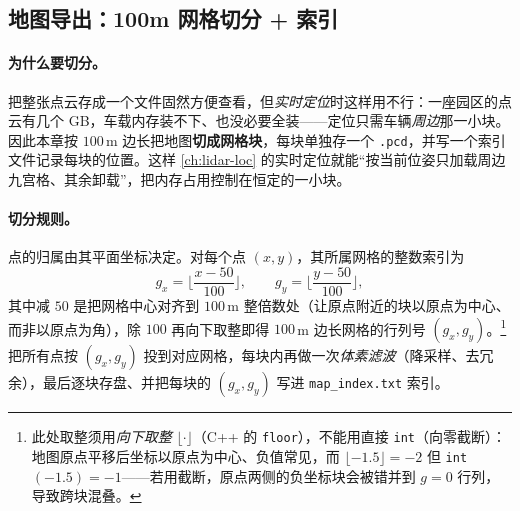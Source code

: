 \subsection{地图导出：100m 网格切分 + 索引}
\label{sec:lidar-map-grid}

\paragraph{为什么要切分。}
把整张点云存成一个文件固然方便查看，但\emph{实时定位}时这样用不行：一座园区的点云有几个 GB，车载内存装不下、也没必要全装——定位只需车辆\emph{周边}那一小块。因此本章按 $100$\,m 边长把地图\textbf{切成网格块}，每块单独存一个 \texttt{.pcd}，并写一个索引文件记录每块的位置。这样 \cref{ch:lidar-loc} 的实时定位就能“按当前位姿只加载周边九宫格、其余卸载”，把内存占用控制在恒定的一小块。

\paragraph{切分规则。}
点的归属由其平面坐标决定。对每个点 $(x,y)$，其所属网格的整数索引为\cite{gao2023slamad}
\begin{equation}
\label{eq:lidar-map-grid}
g_x=\Big\lfloor\frac{x-50}{100}\Big\rfloor,\qquad
g_y=\Big\lfloor\frac{y-50}{100}\Big\rfloor,
\end{equation}
其中减 $50$ 是把网格中心对齐到 $100$\,m 整倍数处（让原点附近的块以原点为中心、而非以原点为角），除 $100$ 再向下取整即得 $100$\,m 边长网格的行列号 $(g_x,g_y)$。\footnote{此处取整须用\emph{向下取整} $\lfloor\cdot\rfloor$（C++ 的 \texttt{floor}），不能用直接 \texttt{int}（向零截断）：地图原点平移后坐标以原点为中心、负值常见，而 $\lfloor-1.5\rfloor=-2$ 但 \texttt{int}$(-1.5)=-1$——若用截断，原点两侧的负坐标块会被错并到 $g=0$ 行列，导致跨块混叠。}把所有点按 $(g_x,g_y)$ 投到对应网格，每块内再做一次\emph{体素滤波}（降采样、去冗余），最后逐块存盘、并把每块的 $(g_x,g_y)$ 写进 \texttt{map\_index.\allowbreak txt} 索引。


